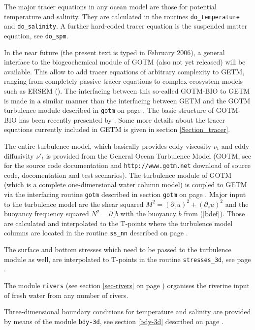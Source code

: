 The major tracer equations in any ocean model are those for potential
temperature and salinity. They are calculated in the routines 
{\tt do\_temperature} and {\tt do\_salinity}. A further hard-coded 
tracer equation is the suspended matter equation, see {\tt do\_spm}.

In the near future (the present text is typed in February 2006),
a general interface to the biogeochemical module of GOTM 
(also not yet released) will be available. 
This allow to add tracer equations of arbitrary complexity to GETM, ranging
from completely passive tracer equations to complex ecosystem models
such as ERSEM (\cite{BARETTAea95}). The interfacing between this
so-called GOTM-BIO to GETM is made in a similar manner than the interfacing
between GETM  and the GOTM turbulence module described in 
{\tt gotm} on page \pageref{sec-gotm}.
The basic structure of GOTM-BIO has been recently presented by 
\cite{BURCHARDea06}.
Some more details about the tracer equations currently included in
GETM is given in section \ref{Section_tracer}.

The entire turbulence model, which basically provides eddy viscosity
$\nu_t$ and eddy diffusivity $\nu'_t$ is provided from the General
Ocean Turbulence Model (GOTM, see \cite{UMLAUFea05} for the
source code documentation and {\tt http://www.gotm.net} download of
source code, docomentation and test scenarios). The turbulence module
of GOTM (which is a complete one-dimensional water column model) is coupled
to GETM via the interfacing routine {\tt gotm} described in section
{\tt gotm} on page \pageref{sec-gotm}. Major input to the turbulence model
are the shear squared 
$M^2=\left(\partial_zu\right)^2+\left(\partial_zu\right)^2$ and the buoyancy
frequency squared $N^2=\partial_z b$ with the buoyancy $b$ from (\ref{bdef}).
Those are calculated and interpolated to the T-points where the 
turbulence model columns are located in the routine {\tt ss\_nn}
described on page \pageref{sec-ss-nn}.

The surface and bottom stresses which need to be passed to the turbulence
module as well, are interpolated to T-points in the routine
{\tt stresses\_3d}, see page \pageref{sec-stresses-3d}.

The module {\tt rivers} (see section \ref{sec-rivers} on page 
\pageref{sec-rivers}) organises the riverine input of fresh water
from any number of rivers.

Three-dimensional boundary conditions for temperature and salinity
are provided by means of the module {\tt bdy-3d}, see section
\ref{bdy-3d} described on page \pageref{bdy-3d}.


